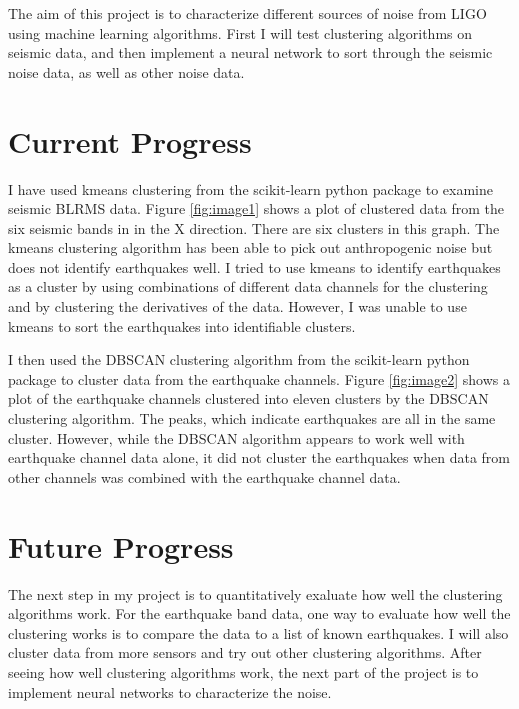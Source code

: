 \documentclass[colorlinks=true,pdfstartview=FitV,linkcolor=blue,
            citecolor=red,urlcolor=magenta]{ligodoc}
\begin{document}
\par The aim of this project is to characterize different sources of noise from LIGO using machine learning algorithms. First I  will test clustering algorithms on seismic data, and then implement a neural network to sort through the seismic noise data, as well as other noise data.        

\section{Current Progress}

\indent

\par I have used kmeans clustering from the scikit-learn python package \cite{Citation2} to examine seismic BLRMS data. Figure \ref{fig:image1} shows a plot of clustered data from the six seismic bands in in the X direction. There are six clusters in this graph. The kmeans clustering algorithm has been able to pick out anthropogenic noise but does not identify earthquakes well. I tried to use kmeans to identify earthquakes as a cluster by using combinations of different data channels for the clustering and by clustering the derivatives of the data. However, I was unable to use kmeans to sort the earthquakes into identifiable clusters.

\par I then used the DBSCAN clustering algorithm from the scikit-learn python package \cite{Citation2} to cluster data from the earthquake channels. Figure \ref{fig:image2} shows a plot of the earthquake channels clustered into eleven clusters by the DBSCAN clustering algorithm. The peaks, which indicate earthquakes are all in the same cluster. However, while the DBSCAN algorithm appears to work well with earthquake channel data alone, it did not cluster the earthquakes when data from other channels was combined with the earthquake channel data.

\section{Future Progress}

\indent

\par The next step in my project is to quantitatively exaluate how well the clustering algorithms work. For the earthquake band data, one way to evaluate how well the clustering works is to compare the data to a list of known earthquakes. I will also cluster data from more sensors and try out other clustering algorithms. After seeing how well clustering algorithms work, the next part of the project is to implement neural networks to characterize the noise. 
\end{document}
